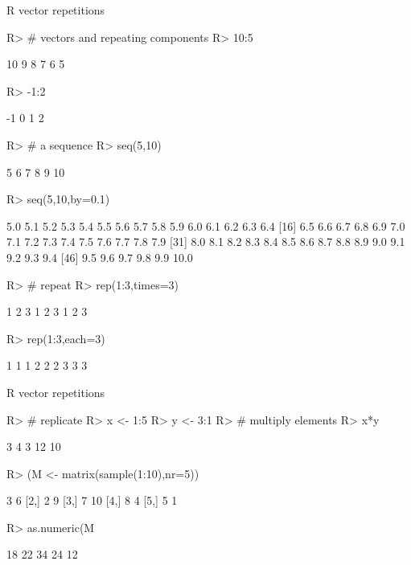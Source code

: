 \documentclass[10pt]{beamer}
\let\proglang=\textsf
\begin{document}
%
\begin{frame}[fragile]{\proglang{R} vector repetitions}
\begin{Schunk}
\begin{Sinput}
R> # vectors and repeating components
R> 10:5
\end{Sinput}
\begin{Soutput}
[1] 10  9  8  7  6  5
\end{Soutput}
\begin{Sinput}
R> -1:2
\end{Sinput}
\begin{Soutput}
[1] -1  0  1  2
\end{Soutput}
\begin{Sinput}
R> # a sequence
R> seq(5,10)
\end{Sinput}
\begin{Soutput}
[1]  5  6  7  8  9 10
\end{Soutput}
\begin{Sinput}
R> seq(5,10,by=0.1)
\end{Sinput}
\begin{Soutput}
 [1]  5.0  5.1  5.2  5.3  5.4  5.5  5.6  5.7  5.8  5.9  6.0  6.1  6.2  6.3  6.4
[16]  6.5  6.6  6.7  6.8  6.9  7.0  7.1  7.2  7.3  7.4  7.5  7.6  7.7  7.8  7.9
[31]  8.0  8.1  8.2  8.3  8.4  8.5  8.6  8.7  8.8  8.9  9.0  9.1  9.2  9.3  9.4
[46]  9.5  9.6  9.7  9.8  9.9 10.0
\end{Soutput}
\begin{Sinput}
R> # repeat
R> rep(1:3,times=3)
\end{Sinput}
\begin{Soutput}
[1] 1 2 3 1 2 3 1 2 3
\end{Soutput}
\begin{Sinput}
R> rep(1:3,each=3)
\end{Sinput}
\begin{Soutput}
[1] 1 1 1 2 2 2 3 3 3
\end{Soutput}
\end{Schunk}
\end{frame}
%
\begin{frame}[fragile]{\proglang{R} vector repetitions}
\begin{Schunk}
\begin{Sinput}
R> # replicate
R> x <- 1:5
R> y <- 3:1
R> # multiply elements
R> x*y
\end{Sinput}
\begin{Soutput}
[1]  3  4  3 12 10
\end{Soutput}
\begin{Sinput}
R> (M <- matrix(sample(1:10),nr=5))
\end{Sinput}
\begin{Soutput}
     [,1] [,2]
[1,]    3    6
[2,]    2    9
[3,]    7   10
[4,]    8    4
[5,]    5    1
\end{Soutput}
\begin{Sinput}
R> as.numeric(M%*%c(2,2))
\end{Sinput}
\begin{Soutput}
[1] 18 22 34 24 12
\end{Soutput}
\end{Schunk}
\end{frame}
\end{document}
